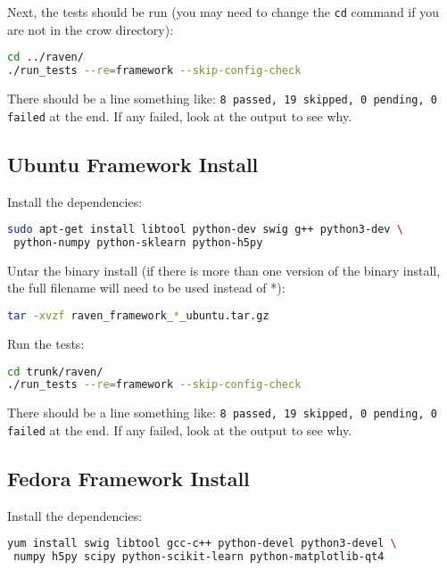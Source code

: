 Next, the tests should be run (you may need to change the \verb'cd'
command if you are not in the crow directory):

\begin{lstlisting}[language=bash]
cd ../raven/
./run_tests --re=framework --skip-config-check
\end{lstlisting}

There should be a line something like:
{\tt 8 passed, 19 skipped, 0 pending, 0 failed}
at the end.  If any failed, look at the output to see why.


\subsection{Ubuntu Framework Install}

Install the dependencies:

\begin{lstlisting}[language=bash]
sudo apt-get install libtool python-dev swig g++ python3-dev \
 python-numpy python-sklearn python-h5py
\end{lstlisting}

Untar the binary install (if there is more than one version of the
binary install, the full filename will need to be used instead of *):

\begin{lstlisting}[language=bash]
tar -xvzf raven_framework_*_ubuntu.tar.gz
\end{lstlisting}

Run the tests:

\begin{lstlisting}[language=bash]
cd trunk/raven/
./run_tests --re=framework --skip-config-check
\end{lstlisting}

There should be a line something like:
{\tt 8 passed, 19 skipped, 0 pending, 0 failed}
at the end.  If any failed, look at the output to see why.

\subsection{Fedora Framework Install}

Install the dependencies:

\begin{lstlisting}[language=bash]
yum install swig libtool gcc-c++ python-devel python3-devel \
 numpy h5py scipy python-scikit-learn python-matplotlib-qt4
\end{lstlisting}

